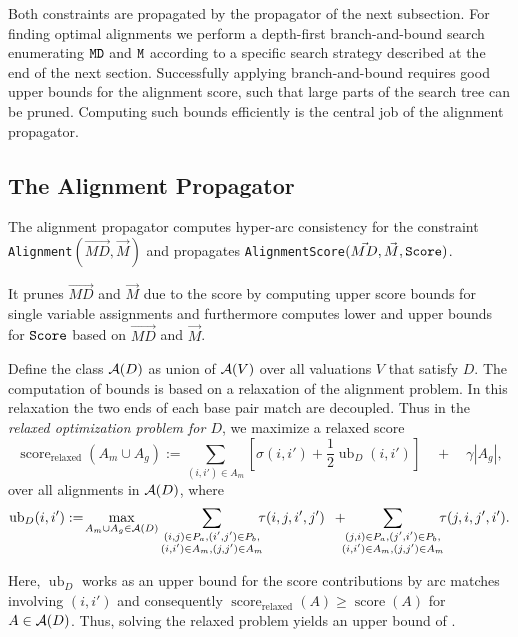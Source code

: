 \documentclass{easychair}
\newcommand{\score}{\operatorname{score}}
\begin{document}
Both constraints are propagated by the propagator of the next
subsection. For finding optimal alignments we perform a depth-first
branch-and-bound search enumerating $\texttt{MD}$ and $\texttt{M}$ according
to a specific search strategy described at the end of the next
section. Successfully applying branch-and-bound requires good upper
bounds for the alignment score, such that large parts of the search
tree can be pruned. Computing such bounds efficiently is the central
job of the alignment propagator.

\subsection{The Alignment Propagator}

The alignment propagator computes hyper-arc consistency for the constraint
\texttt{Alignment}$(\vec{MD},\vec{M})$ and propagates
\texttt{AlignmentScore}$(\vec{MD},\vec{M},\texttt{Score})$.

It prunes $\vec{MD}$ and $\vec{M}$ due to the score by computing upper
score bounds for single variable assignments and furthermore computes
lower and upper bounds for $\texttt{Score}$ based on $\vec{MD}$ and
$\vec{M}$.

Define the class ${\mathcal A}(D)$ as union of ${\mathcal A}(V)$ over all valuations $V$
that satisfy $D$. The computation of bounds is based on a relaxation of
the alignment problem. In this relaxation the two ends of each base
pair match are decoupled. Thus in the \emph{relaxed optimization
  problem for $D$}, we maximize a relaxed score
\vspace{-6pt}
 \begin{displaymath}
  \score_\text{relaxed}(A_m\cup A_g) :=
  \sum_{(i,i')\in A_m} \left[
  \sigma(i,i') + \frac{1}{2}\operatorname{ub}_D(i,i') \right]
  \quad + \quad \gamma |A_g|,
\end{displaymath}
\vspace{-8pt}
over all alignments in ${\mathcal A}(D)$, where
\begin{displaymath}
  \operatorname{ub}_D(i,i') :=\! \max_{A_m\cup A_g\in\cA(D)} \sum_{\substack{(i,j)\in P_a,(i',j')\in P_b,\\(i,i')\in A_m,(j,j')\in A_m}} \!\!\!\tau(i,j,i',j')\,\,\,
   + \!\!\!\sum_{\substack{(j,i)\in P_a,(j',i')\in P_b,\\(i,i')\in A_m,(j,j')\in A_m}} \!\!\!\tau(j,i,j',i').
\end{displaymath}

Here, $\operatorname{ub}_D$ works as an upper bound for the score
contributions by arc matches involving $(i,i')$ and consequently
$\score_\text{relaxed}(A) \geq \score(A)$ for $A\in{\mathcal A}(D)$. Thus,
solving the relaxed problem yields an upper bound of .
\end{document}
